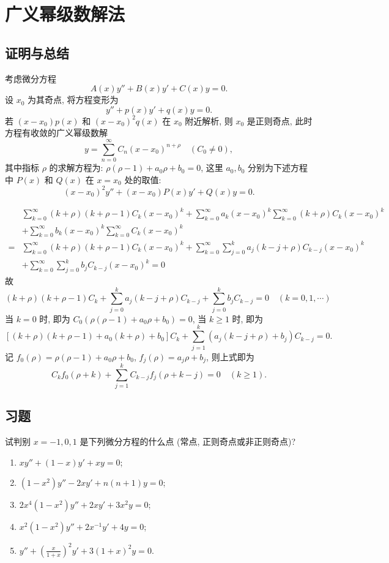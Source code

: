 \section{广义幂级数解法}



\subsection{证明与总结}



考虑微分方程
\[A(x)y''+B(x)y'+C(x)y=0.\]
设 $x_0$ 为其奇点, 将方程变形为
\[y''+p(x)y'+q(x)y=0.\]
若 $(x-x_0)p(x)$ 和 $(x-x_0)^2q(x)$ 在 $x_0$ 附近解析, 则 $x_0$ 是正则奇点, 此时方程有收敛的广义幂级数解
\[y=\sum_{n=0}^{\infty}C_n(x-x_0)^{n+\rho}\quad (C_0\neq 0),\]
其中指标 $\rho$ 的求解方程为: $\rho(\rho-1)+a_0\rho+b_0=0$, 
这里 $a_0,b_0$ 分别为下述方程中 $P(x)$ 和 $Q(x)$ 在 $x=x_0$ 处的取值:
\[(x-x_0)^2y''+(x-x_0)P(x)y'+Q(x)y=0.\]

\[\begin{split}
&\sum_{k=0}^{\infty}(k+\rho)(k+\rho-1)C_k(x-x_0)^k+\sum_{k=0}^{\infty}a_k(x-x_0)^k\sum_{k=0}^{\infty}(k+\rho)C_k(x-x_0)^k\\
&+\sum_{k=0}^{\infty}b_k(x-x_0)^k\sum_{k=0}^{\infty}C_k(x-x_0)^k\\
=&\sum_{k=0}^{\infty}(k+\rho)(k+\rho-1)C_k(x-x_0)^k+\sum_{k=0}^{\infty}\sum_{j=0}^ka_j(k-j+\rho)C_{k-j}(x-x_0)^k\\
&+\sum_{k=0}^{\infty}\sum_{j=0}^kb_jC_{k-j}(x-x_0)^k=0
\end{split}\]
故
\[(k+\rho)(k+\rho-1)C_k+\sum_{j=0}^ka_j(k-j+\rho)C_{k-j}+\sum_{j=0}^kb_jC_{k-j}=0
  \quad (k=0,1,\cdots)\]
当 $k=0$ 时, 即为 $C_0(\rho(\rho-1)+a_0\rho+b_0)=0$, 当 $k\geq 1$ 时, 即为
\[\left[(k+\rho)(k+\rho-1)+a_0(k+\rho)+b_0\right]C_k+\sum_{j=1}^k\left(a_j(k-j+\rho)+b_j\right)C_{k-j}=0.\]
记 $f_0(\rho)=\rho(\rho-1)+a_0\rho+b_0$, $f_j(\rho)=a_j\rho+b_j$, 则上式即为
\[C_kf_0(\rho+k)+\sum_{j=1}^kC_{k-j}f_j(\rho+k-j)=0\quad (k\geq 1).\]



\subsection{习题}



\begin{exercise}
  试判别 $x=-1,0,1$ 是下列微分方程的什么点 (常点, 正则奇点或非正则奇点)?
  \begin{enumerate}[(1)]
  \item $xy''+(1-x)y'+xy=0$;
  \item $(1-x^2)y''-2xy'+n(n+1)y=0$;
  \item $2x^4(1-x^2)y''+2xy'+3x^2y=0$;
  \item $x^2(1-x^2)y''+2x^{-1}y'+4y=0$;
  \item $\displaystyle y''+\left(\frac{x}{1+x}\right)^2y'+3(1+x)^2y=0$.
  \end{enumerate}
\end{exercise}

